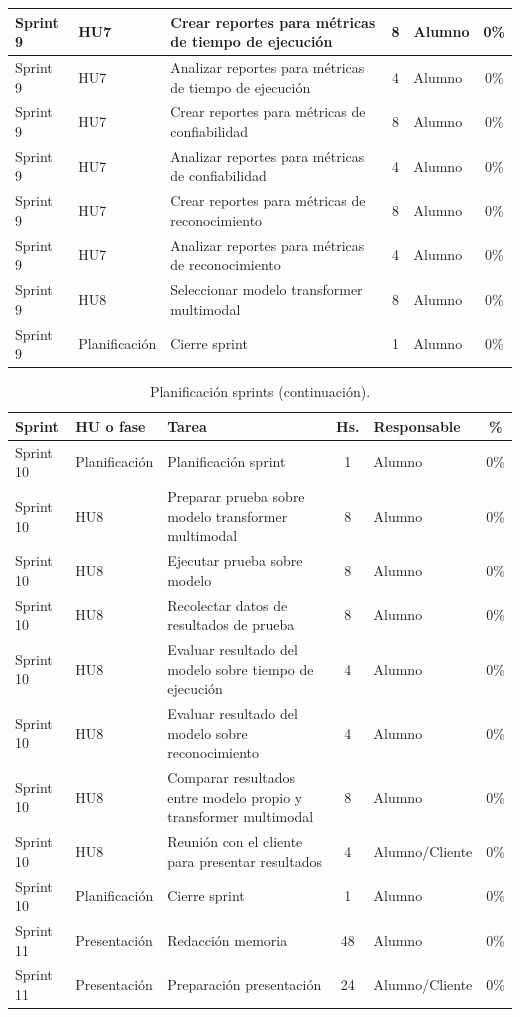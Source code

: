 \documentclass[
11pt, %
]{charter}
\begin{document}
\begin{table}[htpb]
\begin{tabularx}{\linewidth}{@{}|l|l|X|c|l|c|@{}}
Sprint 9	&	HU7	&	Crear reportes para métricas de tiempo de ejecución	&	8	&	Alumno	&	0\%	\\ \hline
Sprint 9	&	HU7	&	Analizar reportes para métricas de tiempo de ejecución	&	4	&	Alumno	&	0\%	\\ \hline
Sprint 9	&	HU7	&	Crear reportes para métricas de confiabilidad	&	8	&	Alumno	&	0\%	\\ \hline
Sprint 9	&	HU7	&	Analizar reportes para métricas de confiabilidad	&	4	&	Alumno	&	0\%	\\ \hline
Sprint 9	&	HU7	&	Crear reportes para métricas de reconocimiento	&	8	&	Alumno	&	0\%	\\ \hline
Sprint 9	&	HU7	&	Analizar reportes para métricas de reconocimiento	&	4	&	Alumno	&	0\%	\\ \hline
Sprint 9	&	HU8	&	Seleccionar modelo transformer multimodal	&	8	&	Alumno	&	0\%	\\ \hline
Sprint 9	&	Planificación	&	Cierre sprint	&	1	&	Alumno	&	0\%	\\ \hline

\end{tabularx}
\end{table}
\begin{table}[htpb]
\centering
\caption{Planificación sprints (continuación).}
\begin{tabularx}{\linewidth}{@{}|l|l|X|c|l|c|@{}}
\hline
\rowcolor[HTML]{C0C0C0}
Sprint	&	HU o fase	&	Tarea	&	Hs.	&	Responsable	&	\%	\\ \hline

Sprint 10	&	Planificación	&	Planificación sprint	&	1	&	Alumno	&	0\%	\\ \hline
Sprint 10	&	HU8	&	Preparar prueba sobre modelo transformer multimodal	&	8	&	Alumno	&	0\%	\\ \hline
Sprint 10	&	HU8	&	Ejecutar prueba sobre modelo	&	8	&	Alumno	&	0\%	\\ \hline
Sprint 10	&	HU8	&	Recolectar datos de resultados de prueba	&	8	&	Alumno	&	0\%	\\ \hline
Sprint 10	&	HU8	&	Evaluar resultado del modelo sobre tiempo de ejecución	&	4	&	Alumno	&	0\%	\\ \hline
Sprint 10	&	HU8	&	Evaluar resultado del modelo sobre reconocimiento	&	4	&	Alumno	&	0\%	\\ \hline
Sprint 10	&	HU8	&	Comparar resultados entre modelo propio y transformer multimodal	&	8	&	Alumno	&	0\%	\\ \hline
Sprint 10	&	HU8	&	Reunión con el cliente para presentar resultados	&	4	&	Alumno/Cliente	&	0\%	\\ \hline
Sprint 10	&	Planificación	&	Cierre sprint	&	1	&	Alumno	&	0\%	\\ \hline
Sprint 11	&	Presentación	&	Redacción memoria	&	48	&	Alumno	&	0\%	\\ \hline
Sprint 11	&	Presentación	&	Preparación presentación	&	24	&	Alumno/Cliente	&	0\%	\\ \hline

\end{tabularx}
\end{table}
\end{document}
